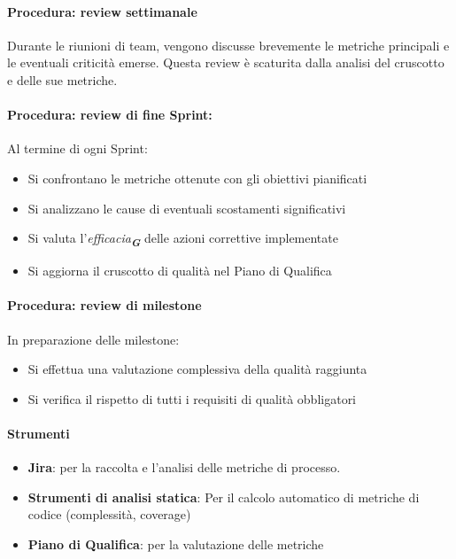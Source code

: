 \documentclass[a4paper,12pt]{article}
\newcommand{\glossario}[1]{\textit{#1}\textsubscript{\textbf{\textit{\textcolor{lightblack}{G}}}}}
\begin{document}
\paragraph{Procedura: review settimanale}
Durante le riunioni di team, vengono discusse brevemente le metriche principali
e le eventuali criticità emerse. Questa review è scaturita dalla analisi del
cruscotto e delle sue metriche.
\paragraph{Procedura: review di fine Sprint:}
Al termine di ogni Sprint:
\begin{itemize}
    \item Si confrontano le metriche ottenute con gli obiettivi pianificati
    \item Si analizzano le cause di eventuali scostamenti significativi
    \item Si valuta l'\glossario{efficacia} delle azioni correttive implementate
    \item Si aggiorna il cruscotto di qualità nel Piano di Qualifica
\end{itemize}
\paragraph{Procedura: review di milestone}
In preparazione delle milestone:
\begin{itemize}
    \item Si effettua una valutazione complessiva della qualità raggiunta
    \item Si verifica il rispetto di tutti i requisiti di qualità obbligatori
\end{itemize}

\paragraph{Strumenti}
\begin{itemize}
    \item \textbf{Jira}: per la raccolta e l'analisi delle metriche di processo.
    \item \textbf{Strumenti di analisi statica}: Per il calcolo automatico di metriche di codice (complessità, coverage)
    \item \textbf{Piano di Qualifica}: per la valutazione delle metriche
\end{itemize}
\end{document}
